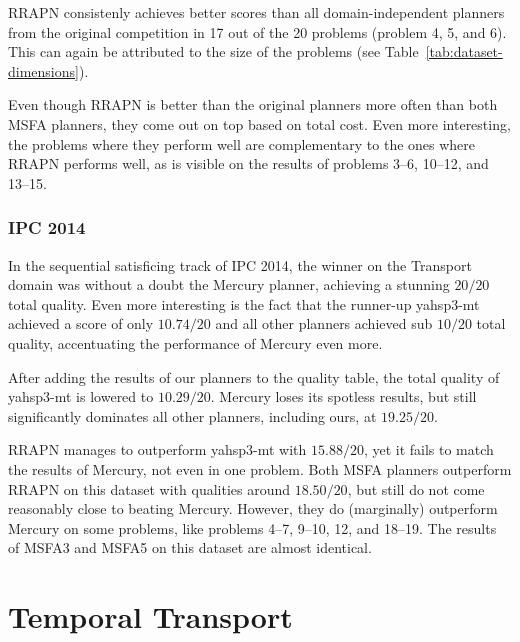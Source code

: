 RRAPN consistenly achieves better scores than all domain-independent planners from the original competition in 17 out of the 20 problems (problem 4, 5, and 6). This can again be attributed to the size
of the problems (see Table~\ref{tab:dataset-dimensions}).

Even though RRAPN is better than the original planners more often than both MSFA planners,
they come out on top based on total cost. Even more interesting, the problems
where they perform well are complementary to the ones where RRAPN performs well,
as is visible on the results of problems 3--6, 10--12, and 13--15.

\subsubsection{IPC 2014}

In the sequential satisficing track of IPC 2014, the winner on the Transport domain
was without a doubt the Mercury planner, achieving
a stunning $20/20$ total quality. Even more interesting is the fact that
the runner-up yahsp3-mt achieved a score of only $10.74/20$
and all other planners achieved sub $10/20$ total quality,
accentuating the performance of Mercury even more.

After adding the results of our planners to the quality table,
the total quality of yahsp3-mt is lowered to $10.29/20$.
Mercury loses its spotless results, but still significantly dominates all
other planners, including ours, at $19.25/20$.

RRAPN manages to outperform yahsp3-mt with $15.88/20$, yet it fails
to match the results of Mercury, not even in one problem.
Both MSFA planners outperform RRAPN on this dataset with qualities around $18.50/20$,
but still do not come reasonably close to beating Mercury.
However, they do (marginally) outperform Mercury on some problems, like
problems 4--7, 9--10, 12, and 18--19.
The results of MSFA3 and MSFA5 on this dataset are almost identical.

















\section{Temporal Transport}

